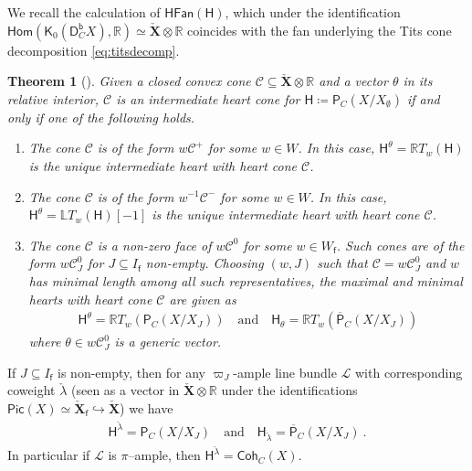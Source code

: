\documentclass[reqno,a4paper]{amsart}
\newcommand{\calC}{\mathcal{C}}
\newcommand{\calL}{\mathcal{L}}
\newcommand{\LL}{\mathbb{L}}
\newcommand{\R}{\mathbb{R}}
\newcommand{\sfH}{\mathsf{H}}
\newcommand{\sfK}{\mathsf{K}}
\newcommand{\sff}{\mathsf{f}}
\newcommand{\bfX}{\mathbf{X}}
\newcommand{\catPC}{\mathsf{P}_{C}}
\newcommand{\barcatPC}{\overline{\mathsf{P}}_{C}}
\newcommand{\catCohC}{\mathsf{Coh}_C}
\newcommand{\catDbC}{\mathsf{D}^\mathsf{b}_C}
\newcommand{\Llambda}{{\check{\lambda}}}
\newcommand{\weightlattice}{\bfX}
\newcommand{\coweightlattice}{\check{\weightlattice}}
\newcommand{\coweightlatticefin}{\coweightlattice_\sff}
\newcommand{\rsv}{X}
\newcommand{\ssv}{X_\emptyset}
\newcommand{\psv}{X_J}
\newcommand{\Hom}{\mathsf{Hom}}
\newcommand{\Pic}{\mathsf{Pic}}
\theoremstyle{basic-theorem}
\newtheorem{theorem}{Theorem}[section]
\numberwithin{equation}{section}
\begin{document}
We recall the calculation of $\mathsf{HFan}(\sfH)$, which under the identification $\Hom(\sfK_0(\catDbC\rsv),\R)\simeq \coweightlattice\otimes \R$ coincides with the fan underlying the Tits cone decomposition \eqref{eq:titsdecomp}.
\begin{theorem}[{\cite[Theorem~C]{Shimpi_Torsion_pairs}}]\label{thm:heartfan-of-nilpPi}
    Given a closed convex cone $\calC\subseteq \coweightlattice\otimes\R$ and a vector $\theta$ in its relative interior, $\calC$ is an intermediate heart cone for $\sfH\coloneqq\catPC(\rsv/\ssv)$ if and only if one of the following holds.
    \begin{enumerate}\itemsep0.2cm
        \item The cone $\calC$ is of the form $w\calC^+$ for some $w\in W$. In this case, $\sfH^\theta=\R T_w (\sfH)$ is the unique intermediate heart with heart cone $\calC$.
        \item The cone $\calC$ is of the form $w^{-1}\calC^-$ for some $w\in W$. In this case, $\sfH^\theta=\LL T_w (\sfH)[-1]$ is the unique intermediate heart with heart cone $\calC$.
        \item The cone $\calC$ is a non-zero face of $w\calC^0$ for some $w\in W_\sff$. Such cones are of the form $w\calC^0_J$ for $J\subseteq I_\sff$ non-empty. Choosing $(w,J)$ such that $\calC=w\calC^0_J$ and $w$ has minimal length among all such representatives, the maximal and minimal hearts with heart cone $\calC$ are given as
		\begin{align}
	        \sfH^\theta=\R T_w(\catPC(\rsv/\psv))\quad\text{and}\quad \sfH_\theta=\R T_w(\barcatPC(\rsv/\psv))
		\end{align}
        where $\theta\in w\calC^0_J$ is a generic vector.
    \end{enumerate}
\end{theorem}

\begin{remark}
	If $J\subseteq I_\sff$ is non-empty, then for any $\varpi_J$-ample line bundle $\calL$ with corresponding coweight $\Llambda$ (seen as a vector in $\coweightlattice\otimes \R$ under the identifications $\Pic(\rsv)\simeq \coweightlatticefin\hookrightarrow \coweightlattice$) we have
    \begin{align}
    \sfH^{\Llambda} = \catPC(\rsv/\psv)\quad\text{and}\quad \sfH_{\Llambda} = \barcatPC(\rsv/\psv) \ .
	\end{align}
    In particular if $\calL$ is $\pi$--ample, then $\sfH^{\Llambda}=\catCohC(\rsv)$.
\end{remark}
\end{document}
